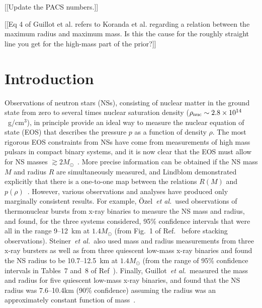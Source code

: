 \documentclass[twocolumn,prd,amssymb,aps,nofootinbib,showpacs,epsf]{revtex4}
\begin{document}
\maketitle

[[Update the PACS numbers.]]

[[Eq 4 of Guillot et al. refers to Koranda et al. regarding a relation between the maximum radius and maximum mass. Is this the cause for the roughly straight line you get for the high-mass part of the prior?]]

\section{Introduction}

Observations of neutron stars (NSs), consisting of nuclear matter in the ground state from zero to several times nuclear saturation density ($\rho_{\rm nuc}\sim2.8\times 10^{14}$~g/cm$^3$), in principle provide an ideal way to measure the nuclear equation of state (EOS) that describes the pressure $p$ as a function of density $\rho$. The most rigorous EOS constraints from NSs have come from measurements of high mass pulsars in compact binary systems, and it is now clear that the EOS must allow for NS masses $\gtrsim 2 M_\odot$~\cite{DemorestPennucciRansom2010, AntoniadisFreireWex2013}. More precise information can be obtained if the NS mass $M$ and radius $R$ are simultaneously measured, and Lindblom demonstrated explicitly that there is a one-to-one map between the relations $R(M)$ and $p(\rho)$~\cite{Lindblom1992}. However, various observations and analyses have produced only marginally consistent results. For example, \"Ozel~{\it et al.}\ used observations of thermonuclear bursts from x-ray binaries to measure the NS mass and radius, and found, for the three systems considered, 95\% confidence intervals that were all in the range 9--12~km at $1.4M_\odot$ (from Fig.~1 of Ref.~\cite{OzelBaymGuver2010} before stacking observations). Steiner~{\it et al.}\ also used mass and radius measurements from three x-ray bursters as well as from three quiescent low-mass x-ray binaries and found the NS radius to be 10.7--12.5~km at $1.4M_\odot$ (from the range of 95\% confidence intervals in Tables~7 and~8 of Ref~\cite{SteinerLattimerBrown2010}). Finally, Guillot~{\it et al.}\ measured the mass and radius for five quiescent low-mass x-ray binaries, and found that the NS radius was 7.6--10.4km (90\% confidence) assuming the radius was an approximately constant function of mass~\cite{GuillotServillatWebb2013}.
\end{document}
